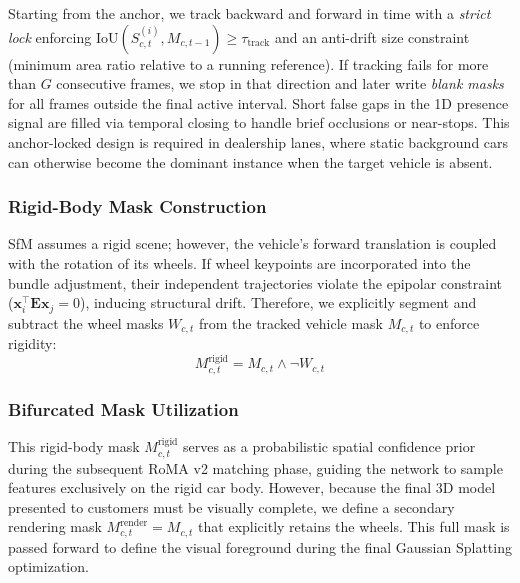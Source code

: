 \documentclass[letterpaper, 10 pt, conference]{ieeeconf}  %
\begin{document}
Starting from the anchor, we track backward and forward in time with a \emph{strict lock} enforcing $\mathrm{IoU}(S_{c,t}^{(i)}, M_{c,t-1}) \ge \tau_{\text{track}}$ and an anti-drift size constraint (minimum area ratio relative to a running reference). If tracking fails for more than $G$ consecutive frames, we stop in that direction and later write \emph{blank masks} for all frames outside the final active interval. Short false gaps in the 1D presence signal are filled via temporal closing to handle brief occlusions or near-stops. This anchor-locked design is required in dealership lanes, where static background cars can otherwise become the dominant instance when the target vehicle is absent.


\subsubsection{Rigid-Body Mask Construction}
SfM assumes a rigid scene; however, the vehicle's forward translation is coupled with the rotation of its wheels. If wheel keypoints are incorporated into the bundle adjustment, their independent trajectories violate the epipolar constraint ($\mathbf{x}_i^\top \mathbf{E} \mathbf{x}_j = 0$), inducing structural drift. Therefore, we explicitly segment and subtract the wheel masks $W_{c,t}$ from the tracked vehicle mask $M_{c,t}$ to enforce rigidity:
\begin{equation}
    M^{\text{rigid}}_{c,t} = M_{c,t} \wedge \neg W_{c,t}
\end{equation}

\subsubsection{Bifurcated Mask Utilization}
This rigid-body mask $M^{\text{rigid}}_{c,t}$ serves as a probabilistic spatial confidence prior during the subsequent RoMA v2 \cite{edstedt2025roma} matching phase, guiding the network to sample features exclusively on the rigid car body. However, because the final 3D model presented to customers must be visually complete, we define a secondary rendering mask $M^{\text{render}}_{c,t} = M_{c,t}$ that explicitly retains the wheels. This full mask is passed forward to define the visual foreground during the final Gaussian Splatting optimization.


\end{document}
